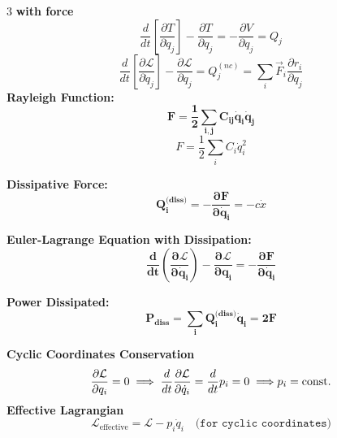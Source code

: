 \documentclass[1pt]{article}
\begin{document}
\begin{multicols}{3}
\textbf{with force}
\begin{equation*}
    \frac{d}{dt}\left[\frac{\partial T}{\partial\dot{q}_{j}}\right]-\frac{\partial T}{\partial q_{j}}=-\frac{\partial V}{\partial q_j}=Q_{j}
\end{equation*}
 \begin{equation*}
     \frac{d}{d t}\left[\frac{\partial \mathcal{L}}{\partial \dot{q}_j}\right]-\frac{\partial \mathcal{L}}{\partial q_j}=Q_j^{(n c)}=\sum_{i}\vec{F}_{i}\frac{\partial r_{i}}{\partial q_{j}}
 \end{equation*}
      \textbf{Rayleigh  Function:}
    \begin{equation*}
        \mathbf{F = \frac{1}{2} \sum_{i,j} C_{ij} \dot{q}_i \dot{q}_j}
    \end{equation*}
    \begin{equation*}
    F = \frac{1}{2} \sum_{i} C_i \dot{q}_i^2
\end{equation*}
    
     \textbf{Dissipative Force:}
    \begin{equation*}
        \mathbf{Q_i^{\text{(diss)}} = - \frac{\partial F}{\partial \dot{q}_i}}=- c \dot{x}
    \end{equation*}
    
     \textbf{Euler-Lagrange Equation with Dissipation:}
    \begin{equation*}
        \mathbf{\frac{d}{dt} \left( \frac{\partial \mathcal{L}}{\partial \dot{q}_i} \right) - \frac{\partial \mathcal{L}}{\partial q_i} = -\frac{\partial F}{\partial \dot{q}_i}}
    \end{equation*}
    
     \textbf{Power Dissipated:}
    \begin{equation*}
        \mathbf{P_{\text{diss}} = \sum_{i} Q_i^{\text{(diss)}} \dot{q}_i = 2F}
    \end{equation*}
    

\textbf{Cyclic Coordinates Conservation}
\begin{equation*}
    \frac{\partial \mathcal{L}}{\partial q_i} = 0 \implies \frac{d}{dt}\frac{\partial \mathcal{L}}{\partial \dot{q}_i} =\frac{d}{dt}p_i = 0 \implies\\ p_i=\text{const.}
\end{equation*}
\textbf{Effective Lagrangian}
\begin{equation*}
        \mathcal{L}_{\text{effective}}=\mathcal{L}-p_i \dot{q}_i\quad \texttt{(for cyclic coordinates)}
\end{equation*}
    

\end{multicols}
\end{document}
